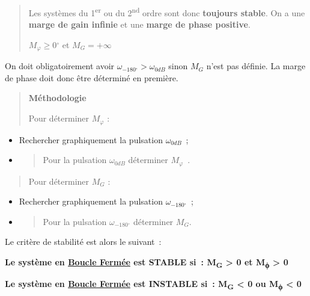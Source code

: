 \begin{quote}
Les systèmes du 1\textsuperscript{er} ou du 2\textsuperscript{nd} ordre sont donc \textbf{toujours stable}. On a une \textbf{marge de gain infinie} et une \textbf{marge de phase positive}.

\(M_{\varphi} \geq 0{^\circ}\) et \(M_{G} = + \infty\)
\end{quote}

On doit obligatoirement avoir \(\omega_{- 180{^\circ}} > \omega_{0dB}\) sinon \(M_{G}\) n'est pas définie. La marge de phase doit donc être déterminé en première.

\begin{quote}
\textbf{Méthodologie}

Pour déterminer \(M_{\varphi}\) :
\end{quote}

\begin{itemize}
\item
  Rechercher graphiquement la pulsation \(\omega_{0dB}\)~;
\end{itemize}

\begin{itemize}
\item
  \begin{quote}
  Pour la pulsation \(\omega_{0dB}\) déterminer \(M_{\varphi}\)~.
  \end{quote}
\end{itemize}

\begin{quote}
Pour déterminer \(M_{G}\) :
\end{quote}

\begin{itemize}
\item
  Rechercher graphiquement la pulsation \(\omega_{- 180{^\circ}}\)~;
\end{itemize}

\begin{itemize}
\item
  \begin{quote}
  Pour la pulsation \(\omega_{- 180{^\circ}}\) déterminer \(M_{G}\).
  \end{quote}
\end{itemize}

Le critère de stabilité est alors le suivant~:

\textbf{Le système en \ul{Boucle Fermée} est STABLE si~: M\textsubscript{G} \textgreater{} 0 et M\textsubscript{ϕ} \textgreater{} 0}

\textbf{Le système en \ul{Boucle Fermée} est INSTABLE si~: M\textsubscript{G} \textless{} 0 ou M\textsubscript{ϕ} \textless{} 0}

